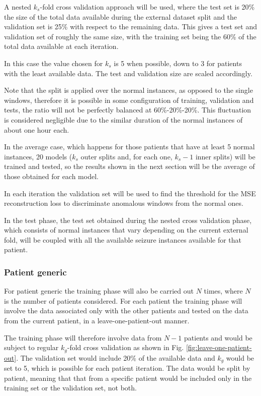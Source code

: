 A nested $k_s$-fold cross validation approach will be used, where the test set is 20\% the size of the total data available during the external dataset split and the validation set is 25\% with respect to the remaining data. This gives a test set and validation set of roughly the same size, with the training set being the 60\% of the total data available at each iteration. 

In this case the value chosen for $k_s$ is 5 when possible, down to 3 for patients with the least available data. The test and validation size are scaled accordingly.

Note that the split is applied over the normal instances, as opposed to the single windows, therefore it is possible in some configuration of training, validation and tests, the ratio will not be perfectly balanced at 60\%-20\%-20\%. This fluctuation is considered negligible due to the similar duration of the normal instances of about one hour each.

In the average case, which happens for those patients that have at least 5 normal instances, 20 models ($k_s$ outer splits and, for each one, $k_s-1$ inner splits) will be trained and tested, so the results shown in the next section will be the average of those obtained for each model. 

In each iteration the validation set will be used to find the threshold for the \gls{MSE} reconstruction loss to discriminate anomalous windows from the normal ones.

In the test phase, the test set obtained during the nested cross validation phase, which consists of normal instances that vary depending on the current external fold, will be coupled with all the available seizure instances available for that patient.

\subsubsection{Patient generic} \label{subsub:patient-generic-exp}
For patient generic the training phase will also be carried out $N$ times, where $N$ is the number of patients considered. For each patient the training phase will involve the data associated only with the other patients and tested on the data from the current patient, in a leave-one-patient-out manner.

The training phase will therefore involve data from $N-1$ patients and would be subject to regular $k_g$-fold cross validation as shown in Fig. \ref{fig:leave-one-patient-out}. The validation set would include 20\% of the available data and $k_g$ would be set to 5, which is possible for each patient iteration. The data would be split by patient, meaning that that from a specific patient would be included only in the training set or the validation set, not both.


